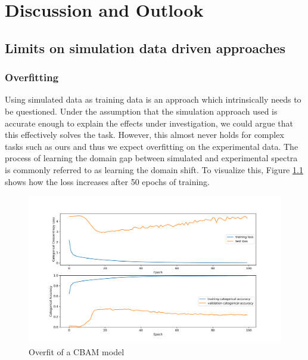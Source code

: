 


\chapter{Discussion and Outlook} %

\label{Chapter5} %


\section{Limits on simulation data driven approaches}

\subsection{Overfitting}
Using simulated data as training data is an approach which intrinsically needs to be questioned. Under the assumption that the simulation approach used is accurate enough to explain the effects under investigation, we could argue that this effectively solves the task. However, this almost never holds for complex tasks such as ours and thus we expect overfitting on the experimental data.
The process of learning the domain gap between simulated and experimental spectra is commonly referred to as learning the domain shift. To visualize this, Figure \ref{fig:overfit} shows how the loss increases after 50 epochs of training. 

\begin{figure}[H]
    \centering
    \includegraphics[width=\textwidth]{Figures/overfit.png}
    \caption{Overfit of a CBAM model}
    \label{fig:overfit}
\end{figure}


